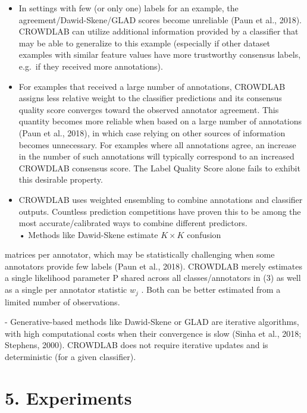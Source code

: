 \documentclass[
]{article}
\providecommand{\tightlist}{%
  \setlength{\itemsep}{0pt}\setlength{\parskip}{0pt}}
\begin{document}
\begin{itemize}
\tightlist
\item
  In settings with few (or only one) labels for an example, the
  agreement/Dawid-Skene/GLAD scores become unreliable (Paun et al.,
  2018). CROWDLAB can utilize additional information provided by a
  classifier that may be able to generalize to this example (especially
  if other dataset examples with similar feature values have more
  trustworthy consensus labels, e.g.~if they received more
  annotations).\\
\item
  For examples that received a large number of annotations, CROWDLAB
  assigns less relative weight to the classifier predictions and its
  consensus quality score converges toward the observed annotator
  agreement. This quantity becomes more reliable when based on a large
  number of annotations (Paun et al., 2018), in which case relying on
  other sources of information becomes unnecessary. For examples where
  all annotations agree, an increase in the number of such annotations
  will typically correspond to an increased CROWDLAB consensus score.
  The Label Quality Score alone fails to exhibit this desirable
  property.\\
\item
  CROWDLAB uses weighted ensembling to combine annotations and
  classifier outputs. Countless prediction competitions have proven this
  to be among the most accurate/calibrated ways to combine different
  predictors.\\
  • Methods like Dawid-Skene estimate \(K \times K\) confusion
\end{itemize}

matrices per annotator, which may be statistically challenging when some
annotators provide few labels (Paun et al., 2018). CROWDLAB merely
estimates a single likelihood parameter P shared across all
classes/annotators in (3) as well as a single per annotator statistic
\(w_{j}\) . Both can be better estimated from a limited number of
observations.

- Generative-based methods like Dawid-Skene or GLAD are iterative
algorithms, with high computational costs when their convergence is slow
(Sinha et al., 2018; Stephens, 2000). CROWDLAB does not require
iterative updates and is deterministic (for a given classifier).

\section{5. Experiments}\label{experiments}
\end{document}
